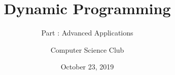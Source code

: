 \documentclass{cspresentation}
\title{Dynamic Programming}
\subtitle{Part \rom{2}: Advanced Applications}
\institute{Stephen Lewis Secondary School}
\author{Computer Science Club}
\date{October 23, 2019}
\begin{document}
\begin{frame}
\titlepage
\end{frame}
\end{document}
